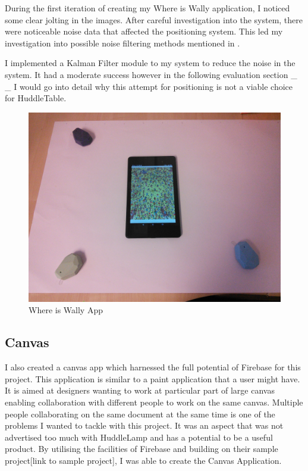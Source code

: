 During the first iteration of creating my Where is Wally application, I noticed some clear jolting in the images. After careful investigation into the system, there were noticeable noise data that affected the positioning system. This led my investigation into possible noise filtering methods mentioned in .

I implemented a Kalman Filter module to my system to reduce the noise in the system. It had a moderate success however in the following evaluation section \_ \_ I would go into detail why this attempt for positioning is not a viable choice for HuddleTable.

\begin{figure}[h]
  \includegraphics[scale=0.2]{images/setup}
  \protect\caption{Where is Wally App} 
  \label{where_is_wally_setup}
\end{figure}

\subsection{Canvas}
I also created a canvas app which harnessed the full potential of Firebase for this project. This application is similar to a paint application that a user might have. It is aimed at designers wanting to work at particular part of large canvas enabling collaboration with different people to work on the same canvas. Multiple people collaborating on the same document at the same time is one of the problems I wanted to tackle with this project. It was an aspect that was not advertised too much with HuddleLamp and has a potential to be a useful product. 
By utilising the facilities of Firebase and building on their sample project[link to sample project], I was able to create the Canvas Application.


